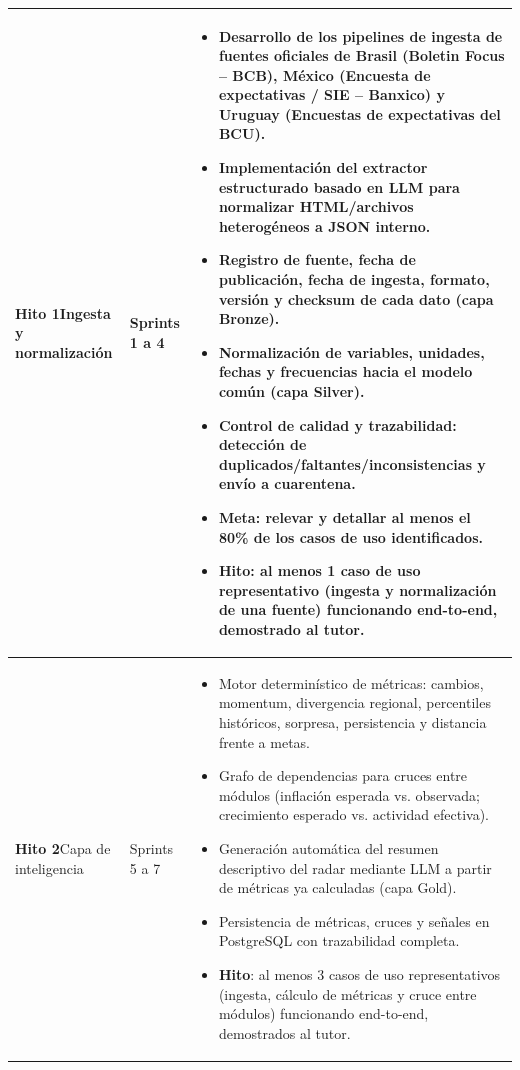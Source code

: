 \documentclass[11pt,a4paper]{article}
\begin{document}
\begin{longtable}{@{}>{\raggedright\arraybackslash}p{2.6cm} >{\raggedright\arraybackslash}p{2cm} >{\raggedright\arraybackslash}p{\dimexpr\textwidth-2.6cm-2cm-6\tabcolsep\relax}@{}}
\textbf{Hito 1}\newline Ingesta y normalizaci\'on & Sprints 1 a 4 &
\begin{itemize}[leftmargin=1em]
  \item Desarrollo de los pipelines de ingesta de fuentes oficiales de Brasil (Boletin Focus -- BCB), M\'exico (Encuesta de expectativas / SIE -- Banxico) y Uruguay (Encuestas de expectativas del BCU).
  \item Implementaci\'on del extractor estructurado basado en LLM para normalizar HTML/archivos heterog\'eneos a JSON interno.
  \item Registro de fuente, fecha de publicaci\'on, fecha de ingesta, formato, versi\'on y checksum de cada dato (capa Bronze).
  \item Normalizaci\'on de variables, unidades, fechas y frecuencias hacia el modelo com\'un (capa Silver).
  \item Control de calidad y trazabilidad: detecci\'on de duplicados/faltantes/inconsistencias y env\'io a cuarentena.
  \item \textbf{Meta}: relevar y detallar al menos el 80\% de los casos de uso identificados.
  \item \textbf{Hito}: al menos 1 caso de uso representativo (ingesta y normalizaci\'on de una fuente) funcionando end-to-end, demostrado al tutor.
\end{itemize} \\
\midrule

\textbf{Hito 2}\newline Capa de inteligencia & Sprints 5 a 7 &
\begin{itemize}[leftmargin=1em]
  \item Motor determin\'istico de m\'etricas: cambios, momentum, divergencia regional, percentiles hist\'oricos, sorpresa, persistencia y distancia frente a metas.
  \item Grafo de dependencias para cruces entre m\'odulos (inflaci\'on esperada vs. observada; crecimiento esperado vs. actividad efectiva).
  \item Generaci\'on autom\'atica del resumen descriptivo del radar mediante LLM a partir de m\'etricas ya calculadas (capa Gold).
  \item Persistencia de m\'etricas, cruces y se\~nales en PostgreSQL con trazabilidad completa.
  \item \textbf{Hito}: al menos 3 casos de uso representativos (ingesta, c\'alculo de m\'etricas y cruce entre m\'odulos) funcionando end-to-end, demostrados al tutor.
\end{itemize} \\
\midrule


\end{longtable}
\end{document}

